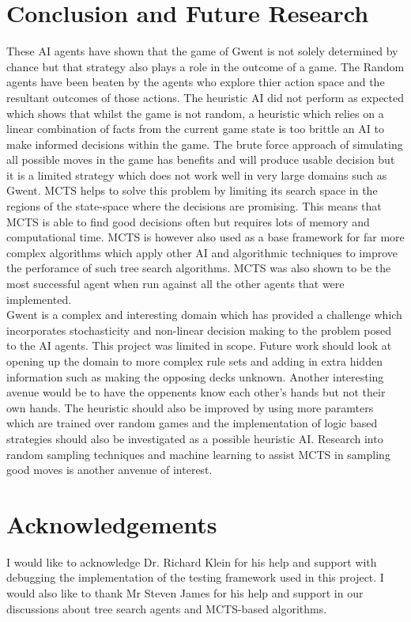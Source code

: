 \documentclass[journal]{IEEEtran}
\begin{document}
\section{Conclusion and Future Research}
These AI agents have shown that the game of Gwent is not solely determined by chance but that strategy also plays a role in the outcome of a game. The Random agents have been beaten by the agents who explore thier action space and the resultant outcomes of those actions. The heuristic AI did not perform as expected which shows that whilst the game is not random, a heuristic which relies on a linear combination of facts from the current game state is too brittle an AI to make informed decisions within the game. The brute force approach of simulating all possible moves in the game has benefits and will produce usable decision but it is a limited strategy which does not work well in very large domains such as Gwent. MCTS helps to solve this problem by limiting its search space in the regions of the state-space where the decisions are promising. This means that MCTS is able to find good decisions often but requires lots of memory and computational time. MCTS is however also used as a base framework for far more complex algorithms which apply other AI and algorithmic techniques to improve the perforamce of such tree search algorithms. MCTS was also shown to be the most successful agent when run against all the other agents that were implemented.\\

Gwent is a complex and interesting domain which has provided a challenge which incorporates stochasticity and non-linear decision making to the problem posed to the AI agents. This project was limited in scope. Future work should look at opening up the domain to more complex rule sets and adding in extra hidden information such as making the opposing decks unknown. Another interesting avenue would be to have the oppenents know each other's hands but not their own hands. The heuristic should also be improved by using more paramters which are trained over random games and the implementation of logic based strategies should also be investigated as a possible heuristic AI. Research into random sampling techniques and machine learning to assist MCTS in sampling good moves is another anvenue of interest.
  
\section*{Acknowledgements}
I would like to acknowledge Dr. Richard Klein for his help and support with debugging the implementation of the testing framework used in this project. I would also like to thank Mr Steven James for his help and support in our discussions about tree search agents and MCTS-based algorithms.\\
\end{document}
